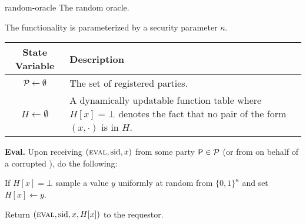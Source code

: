 \begin{cccFunctionality}{\funcRO}
    {random-oracle}
    {The random oracle.}

    The functionality is parameterized by a security parameter $\kappa$.

    \begin{tabularx}{.9\textwidth}{c  X}
        \toprule[.3mm]
        \textbf{State Variable}
         & \textbf{Description}
        \\ \midrule[.3mm]
        $\mathcal{P} \gets \emptyset$
         & The set of registered parties.
        \\ \midrule
        $H \gets \emptyset$
         & A dynamically updatable function table where $H[x] = \bot$ denotes the fact that no pair of the form $(x, \cdot)$ is in $H$.
        \\ \bottomrule[.3mm]
    \end{tabularx}
    \addtocounter{table}{-1}

    \begin{cccItemize}[noitemsep]
        \item \textbf{Eval.} Upon receiving $(\textsc{eval}, \mathrm{sid}, x)$ from some party $\mathsf{P} \in \mathcal{P}$ (or from \adv on behalf of a corrupted \party), do the following:
        \begin{cccEnum}[nosep]
            \item If $H[x] = \bot$ sample a value $y$ uniformly at random from $\{0, 1\}^\kappa$ and set $H[x] \gets y$.
            \item Return $(\textsc{eval}, \mathrm{sid}, x, H[x])$ to the requestor.
        \end{cccEnum}
    \end{cccItemize}
\end{cccFunctionality}
